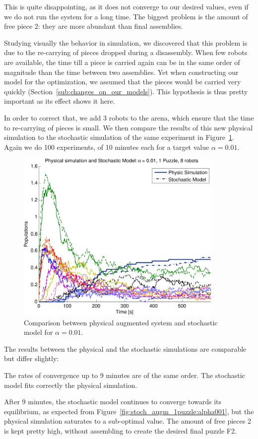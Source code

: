 		This is quite disappointing, as it does not converge to our desired values, even if we do not run the system for a long time. The biggest problem is the amount of free piece 2: they are more abundant than final assemblies.
		
		Studying visually the behavior in simulation, we discovered that this problem is due to the re-carrying of pieces dropped during a disassembly. When few robots are available, the time till a piece is carried again can be in the same order of magnitude than the time between two assemblies. Yet when constructing our model for the optimization, we assumed that the pieces would be carried very quickly (Section~\ref{sub:changes_on_our_models}). This hypothesis is thus pretty important as its effect shows it here.
		
		In order to correct that, we add 3 robots to the arena, which ensure that the time to re-carrying of pieces is small.
		We then compare the results of this new physical simulation to the stochastic simulation of the same experiment in Figure~\ref{fig:img_augm_stochphys_alpha001}. Again we do 100 experiments, of 10 minutes each for a target value $\alpha=0.01$.

		\begin{figure}[h]
			\centering
				\includegraphics[width=10cm]{img/augm_stochphys_alpha001.pdf}
			\caption{Comparison between physical augmented system and stochastic model for $\alpha = 0.01$.}
			\label{fig:img_augm_stochphys_alpha001}
		\end{figure}
		
		The results between the physical and the stochastic simulations are comparable but differ slightly:
		
		\begin{my_itemize}
			\item The rates of convergence up to 9 minutes are of the same order. The stochastic model fits correctly the physical simulation.
			\item After 9 minutes, the stochastic model continues to converge towards its equilibrium, as expected from Figure~\ref{fig:stoch_augm_1puzzle:alpha001}, but the physical simulation saturates to a sub-optimal value. The amount of free pieces 2 is kept pretty high, without assembling to create the desired final puzzle F2. 
		\end{my_itemize}
		
